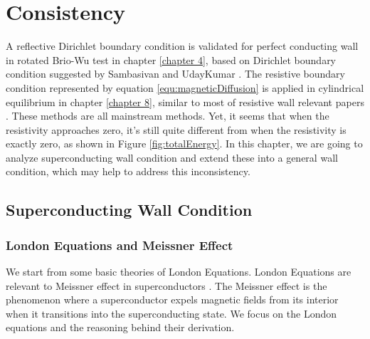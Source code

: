 
\chapter{Consistency}  %

\ifpdf
    \graphicspath{{Chapter10/Figs/Raster/}{Chapter10/Figs/PDF/}{Chapter10/Figs/}}
\else
    \graphicspath{{Chapter10/Figs/Vector/}{Chapter10/Figs/}}
\fi

\label{chapter 10}



A reflective Dirichlet boundary condition is validated for perfect conducting wall in rotated Brio-Wu test in chapter \ref{chapter 4}, based on Dirichlet boundary condition suggested by Sambasivan and UdayKumar \cite{sambasivan2009ghost}. The resistive boundary condition represented by equation \ref{equ:magneticDiffusion} is applied in cylindrical equilibrium in chapter \ref{chapter 8}, similar to most of resistive wall relevant papers \cite{chrysanthou2020,ferraro2016multi,becerra2016resistive,hender1989effects}. These methods are all mainstream methods. Yet, it seems that when the resistivity approaches zero, it's still quite different from when the resistivity is exactly zero, as shown in Figure \ref{fig:totalEnergy}. In this chapter, we are going to analyze superconducting wall condition and extend these into a general wall condition, which may help to address this inconsistency.

\section{Superconducting Wall Condition}
\subsection{London Equations and Meissner Effect}
We start from some basic theories of London Equations. London Equations are relevant to Meissner effect in superconductors \cite{london_equations_wikipedia}. The Meissner effect is the phenomenon where a superconductor expels magnetic fields from its interior when it transitions into the superconducting state. We focus on the London equations and the reasoning behind their derivation.

